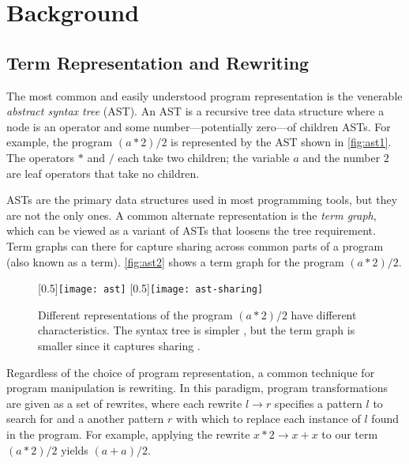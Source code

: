 \chapter{Background}
\label{sec:background}

\section{Term Representation and Rewriting}

The most common and easily understood
 program representation is the venerable
 \textit{abstract syntax tree} (AST).
An AST is a recursive tree data structure
 where a node is an operator and
 some number---potentially zero---of children ASTs.
For example, the program $(a * 2) / 2$
 is represented by the AST shown in \autoref{fig:ast1}.
The operators $*$ and $/$ each take two children;
 the variable $a$ and the number $2$ are leaf operators
 that take no children.

ASTs are the primary data structures used in most programming tools,
 but they are not the only ones.
A common alternate representation is the \textit{term graph},
 which can be viewed as a variant of ASTs that loosens the tree requirement.
Term graphs can there for capture sharing across common parts of a
 program (also known as a term).
\autoref{fig:ast2} shows a term graph for the program $(a * 2) / 2$.

\begin{figure}
    [0.5\linewidth]{\texttt{[image: ast]}}
    [0.5\linewidth]{\texttt{[image: ast-sharing]}}
  \caption{
    Different representations of the program $(a * 2) / 2$ have
     different characteristics.
    The syntax tree is simpler ,
     but the term graph is smaller since it captures sharing .
  }\label{fig:ast}
\end{figure}

Regardless of the choice of program representation,
 a common technique for program manipulation is rewriting.
In this paradigm,
 program transformations are given as a set of rewrites,
 where each
 rewrite $l \to r$ specifies a pattern $l$ to search for
 and a another pattern $r$ with
 which to replace each instance of $l$ found
 in the program.
For example, applying the rewrite $x * 2 \to x + x$
 to our term $(a * 2) / 2$ yields $(a + a) / 2$.

